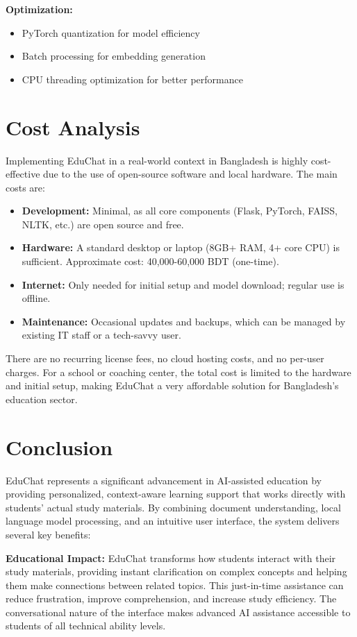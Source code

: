 \documentclass[12pt]{article}
\begin{document}
\textbf{Optimization:}
\begin{itemize}[leftmargin=2em]
    \item PyTorch quantization for model efficiency
    \item Batch processing for embedding generation
    \item CPU threading optimization for better performance
\end{itemize}

\section{Cost Analysis}
Implementing EduChat in a real-world context in Bangladesh is highly cost-effective due to the use of open-source software and local hardware. The main costs are:

\begin{itemize}[leftmargin=2em]
    \item \textbf{Development:} Minimal, as all core components (Flask, PyTorch, FAISS, NLTK, etc.) are open source and free.
    \item \textbf{Hardware:} A standard desktop or laptop (8GB+ RAM, 4+ core CPU) is sufficient. Approximate cost: 40,000-60,000 BDT (one-time).
    \item \textbf{Internet:} Only needed for initial setup and model download; regular use is offline.
    \item \textbf{Maintenance:} Occasional updates and backups, which can be managed by existing IT staff or a tech-savvy user.
\end{itemize}

There are no recurring license fees, no cloud hosting costs, and no per-user charges. For a school or coaching center, the total cost is limited to the hardware and initial setup, making EduChat a very affordable solution for Bangladesh's education sector.

\section{Conclusion}
EduChat represents a significant advancement in AI-assisted education by providing personalized, context-aware learning support that works directly with students' actual study materials. By combining document understanding, local language model processing, and an intuitive user interface, the system delivers several key benefits:

\textbf{Educational Impact:} EduChat transforms how students interact with their study materials, providing instant clarification on complex concepts and helping them make connections between related topics. This just-in-time assistance can reduce frustration, improve comprehension, and increase study efficiency. The conversational nature of the interface makes advanced AI assistance accessible to students of all technical ability levels.
\end{document}
